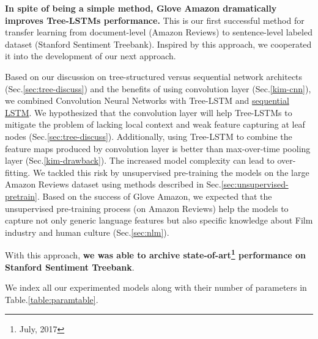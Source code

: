 \begin{description}
\textbf{In spite of being a simple method, Glove Amazon dramatically improves Tree-LSTMs performance.}
This is our first successful method for transfer learning from document-level (Amazon Reviews) to sentence-level labeled dataset (Stanford Sentiment Treebank).
Inspired by this approach, we cooperated it into the development of our next approach.

\item[\deschyperlink{sec:CNNtree}{Combining Recursive Neural Networks with Convolution Neural Networks}] \label{conv-tree-benefits} Based on our discussion on tree-structured versus sequential network architects (Sec.\ref{sec:tree-discuss}) and the benefits of using convolution layer (Sec.\ref{kim-cnn}), we combined Convolution Neural Networks with Tree-LSTM and \hyperref[sec:lstm]{sequential LSTM}.
We hypothesized that the convolution layer will help Tree-LSTMs to mitigate the problem of lacking local context and weak feature capturing at leaf nodes (Sec.\ref{sec:tree-discuss}).
Additionally, using Tree-LSTM to combine the feature maps produced by convolution layer is better than max-over-time pooling layer (Sec.\ref{kim-drawback}).
The increased model complexity can lead to over-fitting.
We tackled this risk by unsupervised pre-training the models on the large Amazon Reviews dataset using methods described in Sec.\ref{sec:unsupervised-pretrain}.
Based on the success of Glove Amazon, we expected that the unsupervised pre-training process (on Amazon Reviews) help the models to capture not only generic language features but also specific knowledge about Film industry and human culture (Sec.\ref{sec:nlm}).

With this approach, \textbf{we was able to archive state-of-art\footnote{July, 2017} performance on Stanford Sentiment Treebank}.
\end{description}

We index all our experimented models along with their number of parameters in Table.\ref{table:paramtable}.

